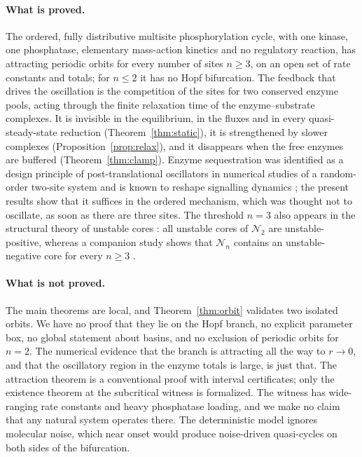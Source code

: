 \documentclass[11pt,a4paper]{article}
\theoremstyle{plain}
\theoremstyle{definition}
\theoremstyle{remark}
\newcommand{\cN}{\mathcal N}
\begin{document}
\paragraph{What is proved.} The ordered, fully distributive multisite phosphorylation cycle, with one kinase, one phosphatase, elementary mass-action kinetics and no regulatory reaction, has attracting periodic orbits for every number of sites $n\ge3$, on an open set of rate constants and totals; for $n\le2$ it has no Hopf bifurcation. The feedback that drives the oscillation is the competition of the sites for two conserved enzyme pools, acting through the finite relaxation time of the enzyme--substrate complexes. It is invisible in the equilibrium, in the fluxes and in every quasi-steady-state reduction (Theorem~\ref{thm:static}), it is strengthened by slower complexes (Proposition~\ref{prop:relax}), and it disappears when the free enzymes are buffered (Theorem~\ref{thm:clamp}). Enzyme sequestration was identified as a design principle of post-translational oscillators in numerical studies of a random-order two-site system \cite{Jolley12} and is known to reshape signalling dynamics \cite{Bluthgen06}; the present results show that it suffices in the ordered mechanism, which was thought not to oscillate, as soon as there are three sites. The threshold $n=3$ also appears in the structural theory of unstable cores \cite{VassenaStadler24}: all unstable cores of $\cN_2$ are unstable-positive, whereas a companion study shows that $\cN_n$ contains an unstable-negative core for every $n\ge3$ \cite{CompanionCores}.

\paragraph{What is not proved.} The main theorems are local, and Theorem~\ref{thm:orbit} validates two isolated orbits. We have no proof that they lie on the Hopf branch, no explicit parameter box, no global statement about basins, and no exclusion of periodic orbits for $n=2$. The numerical evidence that the branch is attracting all the way to $r\to0$, and that the oscillatory region in the enzyme totals is large, is just that. The attraction theorem is a conventional proof with interval certificates; only the existence theorem at the subcritical witness is formalized. The witness has wide-ranging rate constants and heavy phosphatase loading, and we make no claim that any natural system operates there. The deterministic model ignores molecular noise, which near onset would produce noise-driven quasi-cycles on both sides of the bifurcation.
\end{document}
